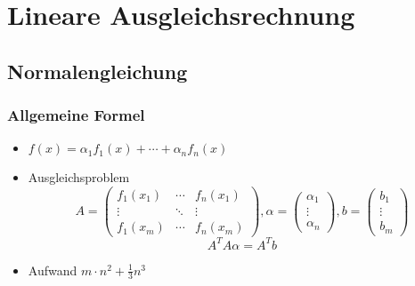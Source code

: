 \section{Lineare Ausgleichsrechnung}

\subsection{Normalengleichung}
\subsubsection*{Allgemeine Formel}
\begin{itemize}

	\item $f(x) = \alpha_1f_1(x) + \cdots + \alpha_nf_n(x)$
	
	\item Ausgleichsproblem
	\begin{displaymath}
		A = 
		\begin{pmatrix}
			f_1(x_1) & \cdots & f_n(x_1) \\
			\vdots & \ddots & \vdots \\
			f_1(x_m) & \cdots & f_n(x_m)
		\end{pmatrix}
		, \alpha =
		\begin{pmatrix}
			\alpha_1 \\ \vdots \\ \alpha_n
		\end{pmatrix}
		, b = 
		\begin{pmatrix}
			b_1 \\ \vdots \\ b_m
		\end{pmatrix}
	\end{displaymath}
	\begin{equation*}
		A^TA\alpha = A^Tb
	\end{equation*}
	
	\item Aufwand $m \cdot n^2 + \frac{1}{3}n^3$

\end{itemize}

